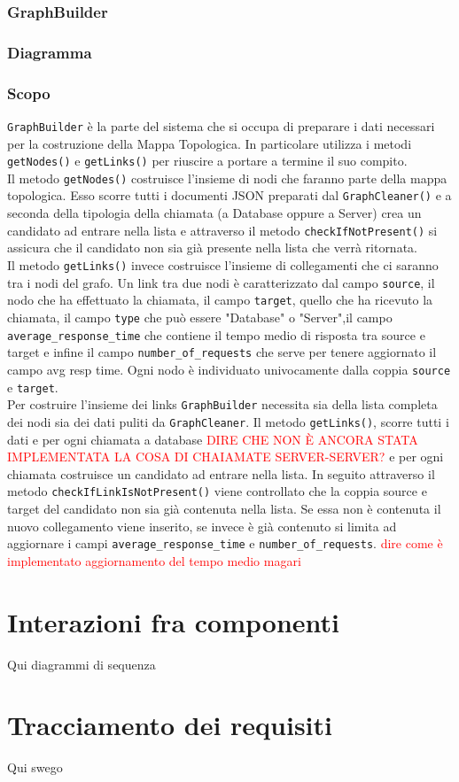 \subsubsection{GraphBuilder}
\label{sec:GraphBuilder}
	\subsubsection{Diagramma}

	\subsubsection{Scopo}
	\texttt{GraphBuilder} è la parte del sistema che si occupa di preparare i dati necessari per la costruzione della Mappa Topologica. In particolare utilizza i metodi \texttt{getNodes()} e \texttt{getLinks()} per riuscire a portare a termine il suo compito.\\
	Il metodo \texttt{getNodes()} costruisce l'insieme di nodi che faranno parte della mappa topologica. Esso scorre tutti i documenti JSON preparati dal \texttt{GraphCleaner()} e a seconda della tipologia della chiamata (a Database oppure a Server) crea un candidato ad entrare nella lista e attraverso il metodo \texttt{checkIfNotPresent()} si assicura che il candidato non sia già presente nella lista che verrà ritornata.\\
	Il metodo \texttt{getLinks()} invece costruisce l'insieme di collegamenti che ci saranno tra i nodi del grafo. Un link tra due nodi è caratterizzato dal campo \texttt{source}, il nodo che ha effettuato la chiamata, il campo \texttt{target}, quello che ha ricevuto la chiamata, il campo \texttt{type} che può essere "Database" o "Server",il campo \texttt{average\_response\_time} che contiene il tempo medio di risposta tra source e target e infine il campo \texttt{number\_of\_requests} che serve per tenere aggiornato il campo avg resp time. Ogni nodo è individuato univocamente dalla coppia \texttt{source} e \texttt{target}.\\	
	Per costruire l'insieme dei links \texttt{GraphBuilder} necessita sia della lista completa dei nodi sia dei dati puliti da \texttt{GraphCleaner}. Il metodo \texttt{getLinks()}, scorre tutti i dati e per ogni chiamata a database \textcolor{red}{DIRE CHE NON È ANCORA STATA IMPLEMENTATA LA COSA DI CHAIAMATE SERVER-SERVER?} e per ogni chiamata costruisce un candidato ad entrare nella lista. In seguito attraverso il metodo \texttt{checkIfLinkIsNotPresent()} viene controllato che la coppia source e target del candidato non sia già contenuta nella lista. Se essa non è contenuta il nuovo collegamento viene inserito, se invece è già contenuto si limita ad aggiornare i campi \texttt{average\_response\_time} e \texttt{number\_of\_requests}. \textcolor{red}{dire come è implementato aggiornamento del tempo medio magari}


\section{Interazioni fra componenti}
\label{sec:Interazioni}
Qui diagrammi di sequenza

\section{Tracciamento dei requisiti}
\label{sec:Tracciamento}
Qui swego 
